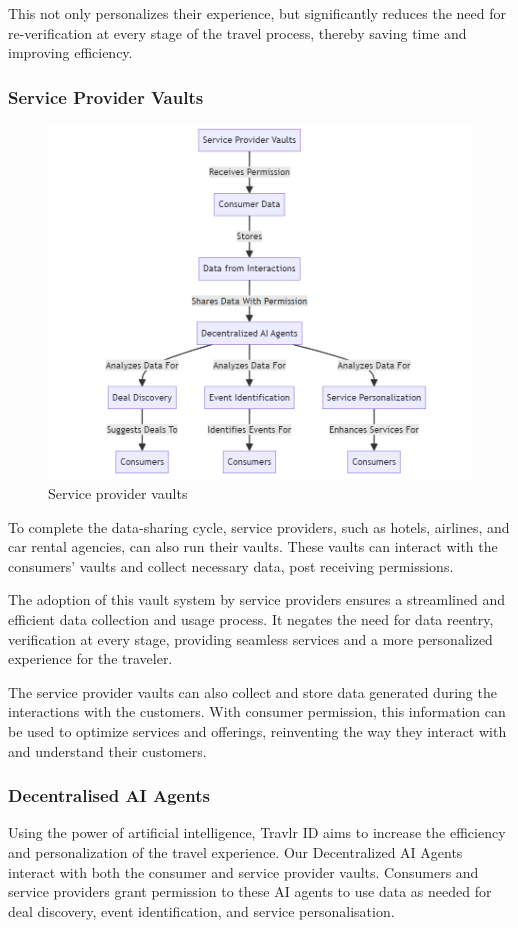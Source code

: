 \documentclass{article}
\begin{document}
This not only personalizes their experience, but significantly reduces the need for re-verification at every stage of the travel process, thereby saving time and improving efficiency.

\subsubsection{Service Provider Vaults}

\begin{figure}[h]
    \centering
    \includegraphics[width=0.6\linewidth]{travlr_diagram_5.png}
    \caption{Service provider vaults}
    \label{fig:enter-label}
\end{figure}

To complete the data-sharing cycle, service providers, such as hotels, airlines, and car rental agencies, can also run their vaults. These vaults can interact with the consumers' vaults and collect necessary data, post receiving permissions.

The adoption of this vault system by service providers ensures a streamlined and efficient data collection and usage process. It negates the need for data reentry, verification at every stage, providing seamless services and a more personalized experience for the traveler.

The service provider vaults can also collect and store data generated during the interactions with the customers. With consumer permission, this information can be used to optimize services and offerings, reinventing the way they interact with and understand their customers.

\subsubsection{Decentralised AI Agents}

Using the power of artificial intelligence, Travlr ID aims to increase the efficiency and personalization of the travel experience. Our Decentralized AI Agents interact with both the consumer and service provider vaults. Consumers and service providers grant permission to these AI agents to use data as needed for deal discovery, event identification, and service personalisation.
\end{document}
